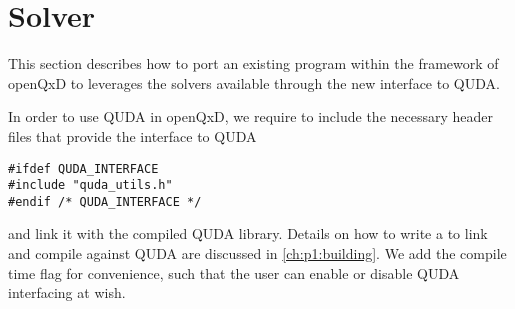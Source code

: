 \chapter{Solver}
\label{ch:p1:solver}

This section describes how to port an existing program within the framework of openQxD to leverages the solvers available through the new interface to QUDA.

In order to use QUDA in openQxD, we require to include the necessary header files that provide the interface to QUDA
\begin{verbatim}
#ifdef QUDA_INTERFACE
#include "quda_utils.h"
#endif /* QUDA_INTERFACE */
\end{verbatim}
and link it with the compiled QUDA library. Details on how to write a  to link and compile against QUDA are discussed in \cref{ch:p1:building}. We add the compile time flag  for convenience, such that the user can enable or disable QUDA interfacing at wish.


